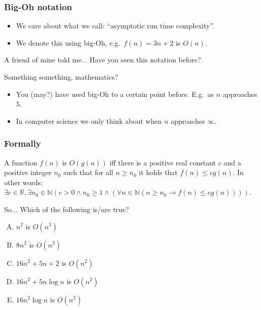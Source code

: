 \begin{frame}
	\frametitle{Big-Oh notation}

	\begin{itemize}
		\item We care about what we call: ``asymptotic run time complexity''.
		\item We denote this using big-Oh, e.g.\ $f(n) = 3n + 2$ is $O(n)$.
	\end{itemize}
	\pause
	\begin{questionblock}{A friend of mine told me...}
		Have you seen this notation before?
	\end{questionblock}
	\pause
	\begin{answerblock}{Something something, mathematics?}
	\begin{itemize}
		\item You (may?) have used big-Oh to a certain point before. E.g.\ as $n$ approaches $5$.
			\pause
		\item In computer science we only think about when $n$ approaches $\infty$.
	\end{itemize}
	\end{answerblock}
\end{frame}

\begin{frame}
	\frametitle{Formally}
	\begin{definition}[Big-Oh]
		A function $f(n)$ is $O(g(n))$ iff there is a positive real constant $c$ and a positive integer $n_0$ such that for
		all $n \geq n_0$ it holds that $f(n) \leq c g(n)$. In other words:\\
		$\exists c \in \mathbb{R}, \exists n_0 \in \mathbb{N} (c > 0 \wedge n_0 \geq 1 \wedge (\forall n \in \mathbb{N} (n
		\geq n_0 \to f(n) \leq cg(n))))$.
	\end{definition}
	\pause
	\begin{questionblock}{So...}
		Which of the following is/are true?
		\begin{enumerate}[A.]
			\item $n^2$ is $O(n^3)$
			\item $8n^2$ is $O(n^2)$
			\item $16n^2 + 5n + 2$ is $O(n^2)$
			\item $16n^2 + 5n \log n$ is $O(n^2)$
			\item $16n^2\log n$ is $O(n^2)$
		\end{enumerate}
	\end{questionblock}
\end{frame}

